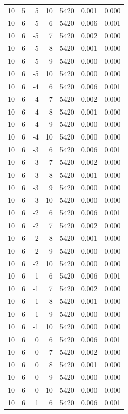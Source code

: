 \begin{table}
\begin{tabular}{rrrrrrr}
10 & 5 & 5 & 10 & 5420 & 0.001 & 0.000 \\
10 & 6 & -5 & 6 & 5420 & 0.006 & 0.001 \\
10 & 6 & -5 & 7 & 5420 & 0.002 & 0.000 \\
10 & 6 & -5 & 8 & 5420 & 0.001 & 0.000 \\
10 & 6 & -5 & 9 & 5420 & 0.000 & 0.000 \\
10 & 6 & -5 & 10 & 5420 & 0.000 & 0.000 \\
10 & 6 & -4 & 6 & 5420 & 0.006 & 0.001 \\
10 & 6 & -4 & 7 & 5420 & 0.002 & 0.000 \\
10 & 6 & -4 & 8 & 5420 & 0.001 & 0.000 \\
10 & 6 & -4 & 9 & 5420 & 0.000 & 0.000 \\
10 & 6 & -4 & 10 & 5420 & 0.000 & 0.000 \\
10 & 6 & -3 & 6 & 5420 & 0.006 & 0.001 \\
10 & 6 & -3 & 7 & 5420 & 0.002 & 0.000 \\
10 & 6 & -3 & 8 & 5420 & 0.001 & 0.000 \\
10 & 6 & -3 & 9 & 5420 & 0.000 & 0.000 \\
10 & 6 & -3 & 10 & 5420 & 0.000 & 0.000 \\
10 & 6 & -2 & 6 & 5420 & 0.006 & 0.001 \\
10 & 6 & -2 & 7 & 5420 & 0.002 & 0.000 \\
10 & 6 & -2 & 8 & 5420 & 0.001 & 0.000 \\
10 & 6 & -2 & 9 & 5420 & 0.000 & 0.000 \\
10 & 6 & -2 & 10 & 5420 & 0.000 & 0.000 \\
10 & 6 & -1 & 6 & 5420 & 0.006 & 0.001 \\
10 & 6 & -1 & 7 & 5420 & 0.002 & 0.000 \\
10 & 6 & -1 & 8 & 5420 & 0.001 & 0.000 \\
10 & 6 & -1 & 9 & 5420 & 0.000 & 0.000 \\
10 & 6 & -1 & 10 & 5420 & 0.000 & 0.000 \\
10 & 6 & 0 & 6 & 5420 & 0.006 & 0.001 \\
10 & 6 & 0 & 7 & 5420 & 0.002 & 0.000 \\
10 & 6 & 0 & 8 & 5420 & 0.001 & 0.000 \\
10 & 6 & 0 & 9 & 5420 & 0.000 & 0.000 \\
10 & 6 & 0 & 10 & 5420 & 0.000 & 0.000 \\
10 & 6 & 1 & 6 & 5420 & 0.006 & 0.001 \\

\end{tabular}
\end{table}
